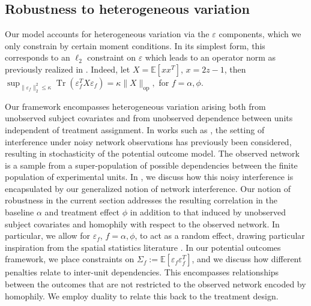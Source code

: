 \documentclass[12pt]{article}
\theoremstyle{definition}
\numberwithin{equation}{section}
\numberwithin{figure}{section}
\newcommand{\mf}[1]{{\color{magenta}[mf: #1]}}
\numberwithin{equation}{section}
\numberwithin{figure}{section}
\begin{document}
\subsection{Robustness to heterogeneous variation} \label{robustness}

Our model accounts for heterogeneous variation via the $\varepsilon$ components, which we only constrain by certain moment conditions. In its simplest form, this corresponds to an $\ell_2$ constraint on $\varepsilon$ which leads to an operator norm as previously realized in \citet{harshaw2024balancing}. Indeed, let $X = \mathbb{E}[xx^T]$, $x=2z-1$, then
$    \sup_{\|\varepsilon_f\|_2^2 \leq \kappa} \operatorname{Tr}(\varepsilon_f^T X \varepsilon_f) =  \kappa \|X\|_{\text{op}},$
for $f = \alpha, \phi.$

Our framework encompasses heterogeneous variation arising both from unobserved subject covariates and from unobserved dependence between units independent of treatment assignment.
In works such as \cite{li2021causal}, the setting of interference under noisy network observations has previously been considered, resulting in stochasticity of the potential outcome model.
The observed network is a sample from a super-population of possible dependencies between the finite population of experimental units.
In , we discuss how this noisy interference is encapsulated by our generalized notion of network interference. 
Our notion of robustness in the current section addresses the resulting correlation in the baseline $\alpha$ and treatment effect $\phi$ in addition to that induced by unobserved subject covariates and homophily with respect to the observed network.
In particular, we allow for $\varepsilon_f$, $f= \alpha, \phi$, to act as a random effect, drawing particular inspiration from the spatial statistics literature \citep{gaetan2010spatial}. 
In our potential outcomes framework, we place constraints on $\Sigma_f := \mathbb{E}[\varepsilon_f \varepsilon_f^T]$, %
and we discuss how different penalties relate to inter-unit dependencies.
This encompasses relationships between the outcomes that are not restricted to the observed network encoded by homophily. We employ duality to relate this back to the treatment design.
\end{document}
